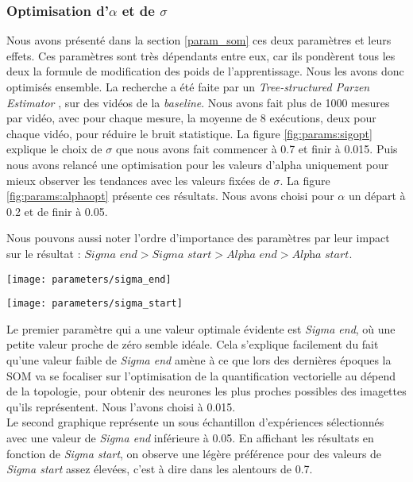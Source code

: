 	\subsubsection{Optimisation d'$\alpha$ et de $\sigma$}

	Nous avons présenté dans la section \ref{param_som} ces deux paramètres et leurs effets. Ces paramètres sont très dépendants entre eux, car ils pondèrent tous les deux la formule de modification des poids de l'apprentissage. Nous les avons donc optimisés ensemble. La recherche a été faite par un \textit{Tree-structured Parzen Estimator} \cite{bergstra2011algorithms}, sur des vidéos de la \textit{baseline}. Nous avons fait plus de 1000 mesures par vidéo, avec pour chaque mesure, la moyenne de 8 exécutions, deux pour chaque vidéo, pour réduire le bruit statistique. La figure \ref{fig:params:sigopt} explique le choix de $\sigma$ que nous avons fait commencer à 0.7 et finir à 0.015. Puis nous avons relancé une optimisation pour les valeurs d'alpha uniquement pour mieux observer les tendances avec les valeurs fixées de $\sigma$. La figure \ref{fig:params:alphaopt} présente ces résultats. Nous avons choisi pour $\alpha$ un départ à 0.2 et de finir à 0.05.

	Nous pouvons aussi noter l'ordre d'importance des paramètres par leur impact sur le résultat : $\textit{Sigma end} > \textit{Sigma start} > \textit{Alpha end} > \textit{Alpha start}$.

	\begin{figureth}
		\begin{subfigureth}{.75\textwidth}
			\texttt{[image: parameters/sigma\_end]}	
		\end{subfigureth}
		\begin{subfigureth}{.75\textwidth}
			\texttt{[image: parameters/sigma\_start]}	
		\end{subfigureth}
		\caption[Optimisation de $\sigma$]{Le premier paramètre qui a une valeur optimale évidente est \textit{Sigma end}, où une petite valeur proche de zéro semble idéale. Cela s'explique facilement du fait qu'une valeur faible de \textit{Sigma end} amène à ce que lors des dernières époques la SOM va se focaliser sur l'optimisation de la quantification vectorielle au dépend de la topologie, pour obtenir des neurones les plus proches possibles des imagettes qu'ils représentent. Nous l'avons choisi à 0.015.\\
		
		Le second graphique représente un sous échantillon d'expériences sélectionnés avec une valeur de \textit{Sigma end} inférieure à 0.05. En affichant les résultats en fonction de \textit{Sigma start}, on observe une légère préférence pour des valeurs de \textit{Sigma start} assez élevées, c'est à dire dans les alentours de 0.7.}\label{fig:params:sigopt}
	\end{figureth}


